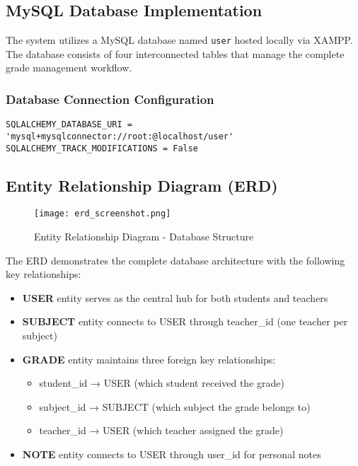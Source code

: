 \documentclass[12pt,a4paper]{article}
\begin{document}
\subsection{MySQL Database Implementation}

The system utilizes a MySQL database named \texttt{user} hosted locally via XAMPP. The database consists of four interconnected tables that manage the complete grade management workflow.

\subsubsection{Database Connection Configuration}
\begin{lstlisting}[caption=Database Configuration]
SQLALCHEMY_DATABASE_URI = 'mysql+mysqlconnector://root:@localhost/user'
SQLALCHEMY_TRACK_MODIFICATIONS = False
\end{lstlisting}

\subsection{Entity Relationship Diagram (ERD)}

\begin{figure}[h]
\centering
\texttt{[image: erd\_screenshot.png]}
\caption{Entity Relationship Diagram - Database Structure}
\label{fig:erd}
\end{figure}

The ERD demonstrates the complete database architecture with the following key relationships:

\begin{itemize}
    \item \textbf{USER} entity serves as the central hub for both students and teachers
    \item \textbf{SUBJECT} entity connects to USER through teacher\_id (one teacher per subject)
    \item \textbf{GRADE} entity maintains three foreign key relationships:
    \begin{itemize}
        \item student\_id → USER (which student received the grade)
        \item subject\_id → SUBJECT (which subject the grade belongs to)
        \item teacher\_id → USER (which teacher assigned the grade)
    \end{itemize}
    \item \textbf{NOTE} entity connects to USER through user\_id for personal notes
\end{itemize}
\end{document}
